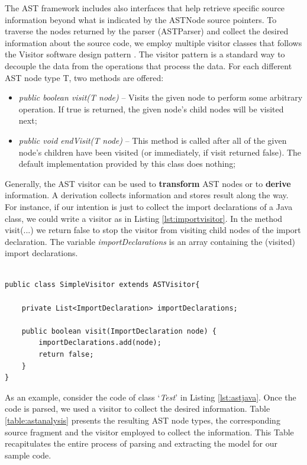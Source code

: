   
The AST framework includes also interfaces that help retrieve specific source information beyond what is indicated by the ASTNode source pointers. To traverse the nodes returned by the parser (ASTParser) and collect the desired information about the source code, we employ multiple visitor classes that follows the Visitor software design pattern \cite{gamma1994design}. 
The visitor pattern is a standard way to decouple the data from the operations that process the data.
For each different AST node type T, two methods are offered:

\begin{itemize}

\item  \textit{public boolean visit(T node)} -- Visits the given node to perform some arbitrary operation. If true is returned, the given node's child nodes will be visited next;
\item  \textit{public void endVisit(T node)} --  This method is called after all of the given node's children have been visited (or immediately, if visit returned false). The default implementation provided by this class does nothing;
\end{itemize}

Generally, the AST visitor can be used to \textbf{transform} AST nodes or to \textbf{derive} information. A derivation collects information and stores result along the way. For instance, if our intention is just to collect the import declarations of a Java class, we could write a visitor as in Listing \ref{lst:importvisitor}. In the method visit(...) we return false to stop the visitor from visiting child nodes of the import declaration. The variable \textit{importDeclarations} is an array containing the (visited) import declarations. 

\begin{lstlisting}[style=java, caption=A visitor for Import declarations in Java source code, label=lst:importvisitor]

public class SimpleVisitor extends ASTVisitor{

	private List<ImportDeclaration> importDeclarations;

	public boolean visit(ImportDeclaration node) {
	    importDeclarations.add(node);
	    return false;
	}
}
\end{lstlisting}

As an example, consider the code of class `\textit{Test}' in Listing \ref{lst:astjava}. Once the code is parsed, we used a visitor to collect the desired information. Table \ref{table:astanalysis} presents the resulting AST node types, the corresponding source fragment and the visitor employed to collect the information. This Table recapitulates the entire process of parsing and extracting the model for our sample code. 


